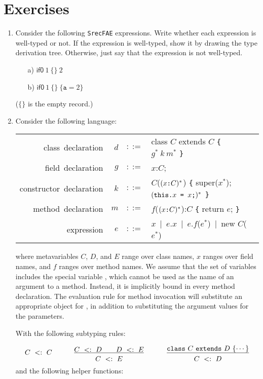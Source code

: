 \section{Exercises}

\begin{enumerate}
\item Consider the following \texttt{SrecFAE} expressions.
Write whether each expression is well-typed or not.
If the expression is well-typed, show it by drawing the type derivation tree.
Otherwise, just say that the expression is not well-typed.

\begin{itemize}
\item[a)]
  $\textsf{if0}\ {1}\ {\{ \}}\ {2}$
\item[b)]
  $\textsf{if0}\ {1}\ {\{ \}}\ {\{\texttt{a}=2\}}$
\end{itemize}

($\{ \}$ is the empty record.)

\item Consider the following language:\\

\begin{tabular}{rr@{~}c@{~}ll}
\mbox{class declaration} &
$d$ &$::=$& class $C$ extends $C$ \verb+{+ $g^*\ k\ m^*$ \verb+}+\\
\mbox{field declaration} &
$g$ &$::=$&$x$:$C$;\\
\mbox{constructor declaration} &
$k$ &$::=$& $C$($(x\mbox{\texttt{:}} C)^*$) \verb+{+ super($x^*$); $(\mbox{\texttt{this.}}x \mbox{\texttt{ = }} x\mbox{\texttt{;}})^*$ \verb+}+\\
\mbox{method declaration} &
$m$ &$::=$& $f$($(x\mbox{\texttt{:}} C)^*$):$C$ \verb+{+ return $e$; \verb+}+\\
\mbox{expression} &
$e$ &$::=$& $x~\mid~e$.$x~\mid~e$.$f$($e^*$)$~\mid~$new $C$($e^*$)
\end{tabular}

where metavariables $C$, $D$, and $E$ range over class names,
$x$ ranges over field names, and
$f$ ranges over method names.
We assume that the set of variables includes the special variable ,
which cannot be used as the name of an argument to a method.
Instead, it is implicitly bound in every method declaration.
The evaluation rule for method invocation will substitute an appropriate object
for , in addition to substituting the argument values for the parameters.

With the following subtyping rules:

\[
\begin{array}{ccc}
C~<:~C
&\qquad
\newinfrule{
C~<:~D \qquad D~<:~E
}
{C~<:~E}
&\qquad
\newinfrule{
\mtt{class}\ C\ \mtt{extends}\ D\ \{ \cdots \}
}
{C~<:~D}
\end{array}
\]
and the following helper functions:


\end{enumerate}
